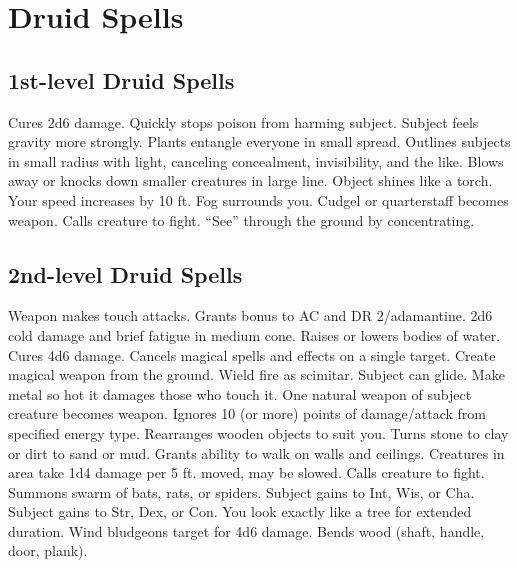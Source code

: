 \section{Druid Spells}\label{Druid Spells}

\subsection{1st-level Druid Spells}
\begin{spelllist}
   Cures 2d6 damage.
   Quickly stops poison from harming subject.
   Subject feels gravity more strongly.
   Plants entangle everyone in small spread.
   Outlines subjects in small radius with light, canceling concealment, invisibility, and the like.
   Blows away or knocks down smaller creatures in large line.
   Object shines like a torch.
   Your speed increases by 10 ft.
   Fog surrounds you.
   Cudgel or quarterstaff becomes  weapon.
   Calls creature to fight.
   ``See'' through the ground by concentrating.
\end{spelllist}

\subsection{2nd-level Druid Spells}
\begin{spelllist}
   Weapon makes touch attacks. 
   Grants  bonus to AC and DR 2/adamantine.
   2d6 cold damage and brief fatigue in medium cone.
   Raises or lowers bodies of water.
   Cures 4d6 damage.
   Cancels magical spells and effects on a single target.
   Create magical weapon from the ground.
   Wield fire as scimitar.
   Subject can glide.
   Make metal so hot it damages those who touch it.
   One natural weapon of subject creature becomes  weapon.
   Ignores 10 (or more) points of damage/attack from specified energy type.
   Rearranges wooden objects to suit you.
   Turns stone to clay or dirt to sand or mud.
   Grants ability to walk on walls and ceilings.
   Creatures in area take 1d4 damage per 5 ft. moved, may be slowed.
   Calls creature to fight.
   Summons swarm of bats, rats, or spiders.
   Subject gains  to Int, Wis, or Cha.
   Subject gains  to Str, Dex, or Con.
   You look exactly like a tree for extended duration.
   Wind bludgeons target for 4d6 damage.
   Bends wood (shaft, handle, door, plank).
\end{spelllist}

